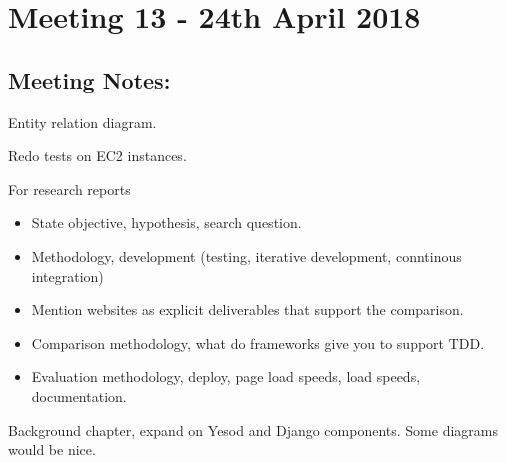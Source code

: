 \section{Meeting 13 - 24th April 2018}

\subsection{Meeting Notes:}
Entity relation diagram.

Redo tests on EC2 instances.

For research reports
\begin{itemize}
  \item State objective, hypothesis, search question.
  \item Methodology, development (testing, iterative development, conntinous integration)
  \item Mention websites as explicit deliverables that support the comparison.
  \item Comparison methodology, what do frameworks give you to support TDD.
  \item Evaluation methodology, deploy, page load speeds, load speeds, documentation.
\end{itemize}

Background chapter, expand on Yesod and Django components. 
Some diagrams would be nice.


